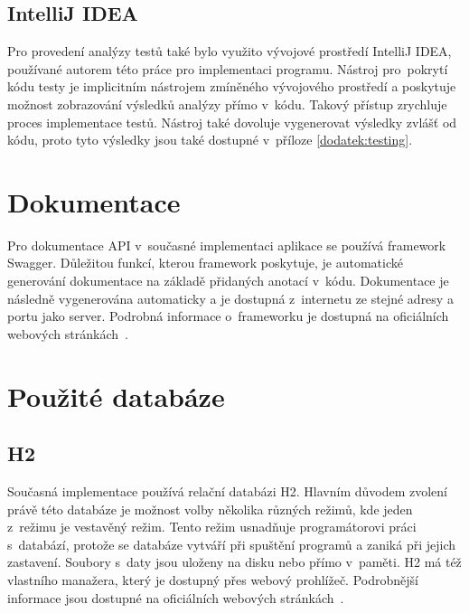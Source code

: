     \subsection{IntelliJ IDEA}\label{resere:testovani:intellij-idea}
        Pro provedení analýzy testů také bylo využito vývojové prostředí IntelliJ IDEA, používané autorem této práce pro implementaci programu. Nástroj pro~pokrytí kódu testy je implicitním nástrojem zmíněného vývojového prostředí a poskytuje možnost zobrazování výsledků analýzy přímo v~kódu. Takový přístup zrychluje proces implementace testů. Nástroj také dovoluje vygenerovat výsledky zvlášť od kódu, proto tyto výsledky jsou také dostupné v~příloze \ref{dodatek:testing}.


\section{Dokumentace}\label{resere:dokumentace}
    Pro dokumentace API v~současné implementaci aplikace se používá framework Swagger. Důležitou funkcí, kterou framework poskytuje, je automatické generování dokumentace na základě přidaných anotací v~kódu. Dokumentace je následně vygenerována automaticky a je dostupná z~internetu ze stejné adresy a portu jako server. Podrobná informace o~frameworku je dostupná na oficiálních webových stránkách~\cite{swagger-doc}.
    
\section{Použité databáze}\label{resere:databaze}

    \subsection{H2}
        Současná implementace používá relační databázi H2. Hlavním důvodem zvolení právě této databáze je možnost volby několika různých režimů, kde jeden z~režimu je vestavěný režim. Tento režim usnadňuje programátorovi práci s~databází, protože se databáze vytváří při spuštění programů a zaniká při jejich zastavení. Soubory s~daty jsou uloženy na disku nebo přímo v~paměti. H2 má též vlastního manažera, který je dostupný přes webový prohlížeč. Podrobnější informace jsou dostupné na oficiálních webových stránkách~\cite{h2-doc}.
        
